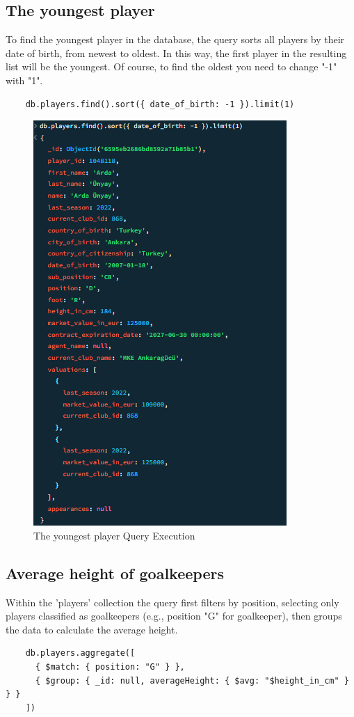 \documentclass{Configuration_Files/PoliMi3i_thesis}
\begin{document}
\subsection{The youngest player}
To find the youngest player in the database, the query sorts all players by their date of birth, from newest to oldest. In this way, the first player in the resulting list will be the youngest. Of course, to find the oldest you need to change "-1" with "1".
\begin{verbatim}
    db.players.find().sort({ date_of_birth: -1 }).limit(1)
\end{verbatim}

\begin{figure}[htbp]
    \centering
    \includegraphics[scale=1.15]{Images/Queries/Youngest/y.png}
    \caption{The youngest player Query Execution}
\end{figure}


\subsection{Average height of goalkeepers}
Within the 'players' collection the query first filters by position, selecting only players classified as goalkeepers (e.g., position "G" for goalkeeper), then groups the data to calculate the average height.
\begin{verbatim}
    db.players.aggregate([
      { $match: { position: "G" } },  
      { $group: { _id: null, averageHeight: { $avg: "$height_in_cm" } } }
    ])
\end{verbatim}
\end{document}
